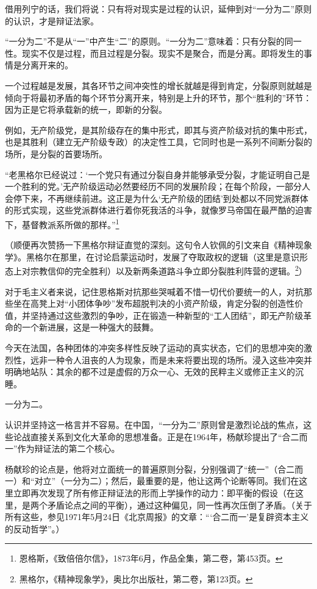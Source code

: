 \documentclass[fontset=fandol, a4paper, 12pt, twoside]{ctexart}
\renewenvironment{quote}
  {\list{}{\rightmargin=0cm \leftmargin=2em}%
   \item\relax\small\kaishu\color{black}}
  {\endlist}
\begin{document}
借用列宁的话，我们将说：只有将对现实是过程的认识，延伸到对“一分为二”原则的认识，才是辩证法家。

“一分为二”不是从“一”中产生“二”的原则。“一分为二”意味着：只有分裂的同一性。现实不仅是过程，而且过程是分裂。现实不是聚合，而是分离。即将发生的事情是分离开来的。

一个过程越是发展，其各环节之间冲突性的增长就越是得到肯定，分裂原则就越是倾向于将最初矛盾的每个环节分离开来，特别是上升的环节，那个“胜利的”环节：因为正是它将承载新的统一，即新的分裂。

例如，无产阶级党，是其阶级存在的集中形式，即其与资产阶级对抗的集中形式，也是其胜利（建立无产阶级专政）的决定性工具，它同时也是一系列不间断分裂的场所，是分裂的首要场所。

\begin{quote}
“老黑格尔已经说过：‘一个党只有通过分裂自身并能够承受分裂，才能证明自己是一个胜利的党。’无产阶级运动必然要经历不同的发展阶段；在每个阶段，一部分人会停下来，不再继续前进。这正是为什么‘无产阶级的团结’到处都以不同党派群体的形式实现，这些党派群体进行着你死我活的斗争，就像罗马帝国在最严酷的迫害下，基督教派系所做的那样。”\footnote{恩格斯，《致倍倍尔信》，1873年6月，作品全集，第二卷，第453页。}
\end{quote}

（顺便再次赞扬一下黑格尔辩证直觉的深刻。这句令人钦佩的引文来自《精神现象学》。黑格尔在那里，在讨论启蒙运动时，发展了夺取政权的逻辑（这里是意识形态上对宗教信仰的完全胜利）以及新两条道路斗争立即分裂胜利阵营的逻辑。\footnote{黑格尔，《精神现象学》，奥比尔出版社，第二卷，第123页。}）

对于毛主义者来说，记住恩格斯对抗那些哭喊着不惜一切代价要统一的人，对抗那些坐在高凳上对“小团体争吵”发布超脱判决的小资产阶级，肯定分裂的创造性价值，并坚持通过这些激烈的争吵，正在锻造一种新型的“工人团结”，即无产阶级革命的一个新进展，这是一种强大的鼓舞。

今天在法国，各种团体的冲突多样性反映了运动的真实状态，它们的思想冲突的激烈性，远非一种令人沮丧的人为现象，而是未来将要出现的场所。浸入这些冲突并明确地站队：其余的都不过是虚假的万众一心、无效的民粹主义或修正主义的沉睡。

一分为二。

认识并坚持这一格言并不容易。在中国，“一分为二”原则曾是激烈论战的焦点，这些论战直接关系到文化大革命的思想准备。正是在1964年，杨献珍提出了“合二而一”作为辩证法的第二个核心。

杨献珍的论点是，他将对立面统一的普遍原则分裂，分别强调了“统一”（合二而一）和“对立”（一分为二）；然后，最重要的是，他让这两个论断等同。我们在这里立即再次发现了所有修正辩证法的形而上学操作的动力：即平衡的假设（在这里，是两个矛盾论点之间的平衡），通过这种偏见，同一性再次压倒了矛盾。（关于所有这些，参见1971年5月24日《北京周报》的文章：“‘合二而一’是复辟资本主义的反动哲学”。）
\end{document}
